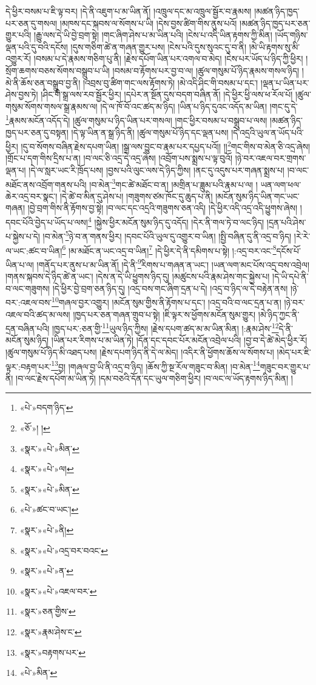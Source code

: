དེ་ཕྱིར་བསམ་པ་ཇི་ལྟ་བར། །དེ་ནི་འཇུག་པ་མ་ཡིན་ནོ། །འཁྲུལ་དང་མ་འཁྲུལ་སྦྱོར་བ་རྣམས། །མཚན་ཉིད་ཁྱད་པར་ཅན་དུ་གསལ། །མཁས་དང་སྐབས་ལ་སོགས་པ་ཡི། །དེས་བྱས་ཚིག་གིས་ནུས་པའོ། །མཚན་ཉིད་ཁྱད་པར་ཅན་གྱུར་པའི། །རྒྱུ་ལས་དེ་ཡི་བྱེ་བྲག་སྟེ། །གང་ཞིག་ཤེས་པ་མ་ཡིན་པའི། །ངེས་པ་འདི་ཡིན་རྟགས་ཀྱི་མིན། །ཡོད་གཉིས་ལྡན་པའི་དུ་བའི་དངོས། །དུས་གཅིག་ཚེ་ན་གཞན་གྱུར་པས། །ངེས་པའི་དུས་སུའང་དུ་བ་ནི། །མེ་ཡི་རྟགས་སུ་མི་འགྱུར་རོ། །བསམ་པ་དེ་རྣམས་གཅིག་པུ་ནི། །རྗེས་དཔོག་ཡིན་པར་འགལ་བ་མེད། །ངེས་པར་ཡོད་པ་ཉིད་ཀྱི་ཕྱིར། །སྲོག་ཆགས་བཅས་སོགས་བསྒྲུབ་པ་ཡི། །བསམ་བ་རྟོགས་པར་བྱ་བ་ལ། །ཚུལ་གསུམ་པོ་ཉིད་རྣམས་གསལ་ཉིད། །མེ་ནི་ཆོས་ཅན་བསྒྲུབ་བྱ་ནི། །འབྲས་བུ་ཚིག་གང་ལས་རྟོགས་ཏེ། །མེ་འདི་ཤིང་གི་བསམ་པ་དང་། །ལྡན་པ་ཡིན་པར་ཤེས་བྱས་ཏེ། །ཤིང་གི་སྒྲ་ལས་རབ་སྦྱོར་ཕྱིར། །དཔེར་ན་སྔོན་དུས་བདག་བཞིན་ནོ། །དེ་ཕྱིར་ཕྱི་ལས་ཕ་རོལ་པོ། །ཚུལ་གསུམ་སོགས་གསལ་སྒྲ་རྣམས་ལ། །དེ་ལ་ཁོ་བོ་འང་ཚད་མ་ཉིད། །ཡིན་པ་ཉིད་དུའང་འདོད་མ་ཡིན། །གང་དུ་དེ་\footnote{«པེ་»བདག་ཉིད་}རྣམས་མངོན་འདོད་དེ། །ཚུལ་གསུམ་པ་ཉིད་ཡིན་པར་གསལ། །གང་ཕྱིར་བསམ་པ་བསྒྲུབ་པ་ལས། །མཚན་ཉིད་ཁྱད་པར་ཅན་དུ་བསྟན། །དེ་ལྟ་ཡིན་ན་སྒྲ་ཉིད་ནི། །ཚུལ་གསུམ་པོ་ཉིད་དང་ལྡན་པས། །དེ་འདྲའི་ཡུལ་ན་ཡོད་པའི་ཕྱིར། །དུ་བ་སོགས་བཞིན་རྗེས་དཔག་ཡིན། །སྒྲ་ལས་བྱུང་བ་རྣམ་པར་དཔྱད་པའོ།། །།\footnote{«ཅོ་»། །}གང་གིས་བ་མེན་ཅི་འདྲ་ཞེས། །གྲོང་པ་དག་གིས་དྲིས་པ་ན། །བ་ལང་ཅི་འདྲ་དེ་འདྲ་ཞེས། །འབྲོག་པས་སྨྲས་པ་ལྟ་བུའོ། །ཉེ་བར་འཇལ་བར་གྲགས་ལྡན་པ། །དེ་ལ་སླར་ཡང་རི་ཁྲོད་པས། །བྱས་པའི་ལུང་ལས་དེ་ཉིད་ཀྱིས། །ནང་དུ་འདུས་པར་གཞན་སྨྲས་པ། །བ་ལང་མཐོང་ནས་འབྲོག་གནས་པའི། །བ་མེན་\footnote{«སྣར་»«པེ་»མིན་}གང་ཚེ་མཐོང་བ་ན། །མགྲིན་པ་ཟླུམ་པའི་རྣམ་པ་ལ། །
ཡན་ལག་ཕལ་ཆེར་འདྲ་བར་སྣང་། །དེ་ཚེ་བ་མིན་དུ་ཤེས་པ། །གཟུགས་ཙམ་ཁོང་དུ་ཆུད་པ་ནི། །མངོན་སུམ་ཉིད་ཡིན་གང་ཡང་གཞན། །བྱེ་བྲག་གིས་ནི་རྟོགས་བྱ་སྟེ། །བ་ལང་དང་འདྲའི་གཟུགས་ཅན་འདི། །དེ་ཕྱིར་འདི་འདྲ་འདི་ཕྱུགས་ཞེས། །དབང་པོའི་བྱེད་པ་ཡོད་པ་ལས།\footnote{«སྣར་»«པེ་»ལ།} །སྐྱེས་ཕྱིར་མངོན་སུམ་ཉིད་དུ་འདོད། །དེར་ནི་གལ་ཏེ་བ་ལང་ཉིད། །དྲན་པའི་ཤེས་པ་སྐྱེས་པ་དེ། །བ་མེན་\footnote{«སྣར་»«པེ་»མིན་}ཉེ་བ་ན་གནས་ཕྱིར། །དབང་པོའི་ཡུལ་དུ་འགྱུར་བ་ཡིན། །སྤྱི་བཞིན་དུ་ནི་འདྲ་བ་ཉིད། །རེ་རེ་ལ་ཡང་:ཚང་བ་ཡིན།\footnote{«པེ་»ཚང་བ་ཡང་།} །མ་མཐོང་ན་ཡང་འདྲ་བ་ཡིན།\footnote{«སྣར་»«པེ་»ནི།} །དེ་ཕྱིར་དེ་ནི་དམིགས་པ་སྟེ། །:འདྲ་བར་འང་\footnote{«སྣར་»«པེ་»འདྲ་བར་བའང་}དངོས་པོ་ཡིན་པ་ལ། །གནོད་པར་ནུས་པ་མ་ཡིན་ནོ། །དེ་ནི་\footnote{«སྣར་»«པེ་»ན་}རིགས་པ་གཞན་ན་ཡང་། །ཡན་ལག་མང་པོས་འདྲ་བས་འབྲེལ། །གནས་སྐབས་དེ་ཉིད་ཚེ་ན་ཡང་། །དེས་ན་དེ་ཡི་ཕྱུགས་ཉིད་དུ། །མཚུངས་པའི་རྣམ་ཤེས་གང་སྐྱེས་པ། །དེ་ཡི་དཔེ་ནི་བ་ལང་གཟུགས། །དེ་ཕྱིར་བྱེ་བྲག་ཅན་ཉིད་དུ། །འདྲ་བས་གང་ཞིག་དྲན་པ་དེ། །འདྲ་བ་ཉིད་ལ་དེ་བརྟེན་ནས། །ཉེ་བར་:འཇལ་བས་\footnote{«སྣར་»«པེ་»འཇལ་བར་}གཞལ་བྱར་འགྱུར། །མངོན་སུམ་གྱིས་ནི་རྟོགས་པ་དང་། །འདྲ་བའི་བ་ལང་དྲན་པ་ན། །ཉེ་བར་འཇལ་བའི་ཚད་མ་ལས། །ཁྱད་པར་ཅན་གཞན་གྲུབ་པ་སྟེ། །ཇི་ལྟར་ས་ཕྱོགས་མངོན་སུམ་གྱུར། །མེ་ཉིད་ཀྱང་ནི་དྲན་བཞིན་པའི། །ཁྱད་པར་:ཅན་གྱི་\footnote{«སྣར་»ཅན་གྱིས་}ཡུལ་ཉིད་ཀྱིས། །རྗེས་དཔག་ཚད་མ་མ་ཡིན་མིན། །:རྣམ་ཤེས་\footnote{«སྣར་»རྣམ་ཤེས་ང་}དེ་ནི་མངོན་སུམ་ཉིད། །ཡིན་པར་རིགས་པ་མ་ཡིན་ཏེ། །དོན་དང་དབང་པོར་མངོན་འབྲེལ་པའི། །བྱ་བ་དེ་ཚེ་མེད་ཕྱིར་རོ། །ཚུལ་གསུམ་པོ་ཉིད་མི་འཐད་པས། །རྗེས་དཔག་ཉིད་ནི་དེ་ལ་མེད། །འདིར་ནི་ཕྱོགས་ཆོས་ལ་སོགས་པ། །མེད་པར་ཇི་ལྟར་:བརྟག་པར་\footnote{«སྣར་»བརྟགས་པར་}བྱ། །གཞལ་བྱ་ཡི་ནི་འདྲ་བ་ཉིད། །ཆོས་ཀྱི་སྔ་རོལ་གཟུང་བ་མིན། །བ་མེན་\footnote{«པེ་»མིན་}གཟུང་བར་གྱུར་པ་ནི། །བ་ལང་རྗེས་དཔོག་མ་ཡིན་ཏེ། །དམ་བཅའི་དོན་དང་ཡུལ་གཅིག་ཕྱིར། །བ་ལང་ལ་ཡོད་རྟགས་ཉིད་མིན། །
